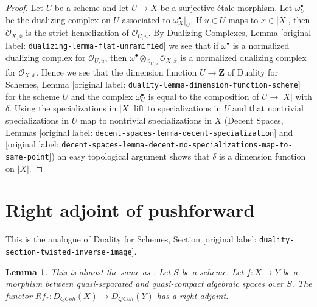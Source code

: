 \documentclass[10pt,a4paper]{article}
\newenvironment{reference}{\comment}{\endcomment}
\theoremstyle{plain}
\newtheorem{lemma}[subsection]{Lemma}
\theoremstyle{definition}
\theoremstyle{remark}
\numberwithin{equation}{subsection}
\def\QCoh{\mathit{QCoh}}
\begin{document}
\begin{proof}
Let $U$ be a scheme and let $U \to X$ be a surjective \'etale morphism.
Let $\omega_U^\bullet$ be the dualizing complex on $U$ associated
to $\omega_X^\bullet|_U$.
If $u \in U$ maps to $x \in |X|$, then $\mathcal{O}_{X, \overline{x}}$
is the strict henselization of $\mathcal{O}_{U, u}$. By
Dualizing Complexes, Lemma \textnormal{[original label: \nolinkurl{dualizing-lemma-flat-unramified}]}
we see that if $\omega^\bullet$ is a normalized dualizing complex
for $\mathcal{O}_{U, u}$, then
$\omega^\bullet \otimes_{\mathcal{O}_{U, u}} \mathcal{O}_{X, \overline{x}}$
is a normalized dualizing complex for $\mathcal{O}_{X, \overline{x}}$.
Hence we see that the dimension function $U \to \mathbf{Z}$ of
Duality for Schemes, Lemma \textnormal{[original label: \nolinkurl{duality-lemma-dimension-function-scheme}]}
for the scheme $U$ and the complex
$\omega_U^\bullet$ is equal to the composition of $U \to |X|$ with $\delta$.
Using the specializations in $|X|$ lift to specializations in $U$
and that nontrivial specializations in $U$ map to
nontrivial specializations in $X$
(Decent Spaces, Lemmas \textnormal{[original label: \nolinkurl{decent-spaces-lemma-decent-specialization}]} and
\textnormal{[original label: \nolinkurl{decent-spaces-lemma-decent-no-specializations-map-to-same-point}]})
an easy topological argument shows that $\delta$ is a dimension function
on $|X|$.
\end{proof}






\section{Right adjoint of pushforward}
\label{section-twisted-inverse-image}

\noindent
This is the analogue of Duality for Schemes, Section
\textnormal{[original label: \nolinkurl{duality-section-twisted-inverse-image}]}.

\begin{lemma}
\label{lemma-twisted-inverse-image}
\begin{reference}
This is almost the same as \cite[Example 4.2]{Neeman-Grothendieck}.
\end{reference}
Let $S$ be a scheme.
Let $f : X \to Y$ be a morphism between quasi-separated and quasi-compact
algebraic spaces over $S$. The functor $Rf_* : D_\QCoh(X) \to D_\QCoh(Y)$
has a right adjoint.
\end{lemma}
\end{document}
